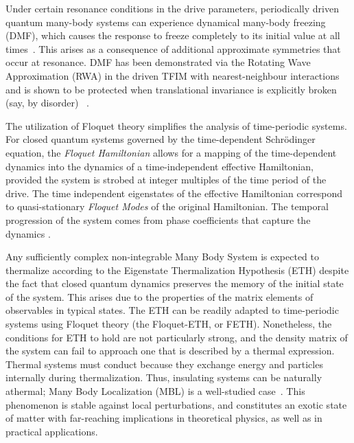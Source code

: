 \documentclass[%
reprint,
superscriptaddress,
linenumbers,
amsmath,amssymb,
aps,
prb,
showkeys,
]{revtex4-2}
\begin{document}
{Under certain resonance conditions in the drive parameters, periodically driven quantum many-body systems can experience dynamical many-body freezing (DMF), which causes the response to freeze completely to its initial value at all times}~\cite{bordia_periodically_2017, sahoo_periodically_2019, das_exotic_2010}. This arises as a consequence of additional approximate symmetries that occur at resonance. DMF has been demonstrated via the Rotating Wave Approximation (RWA) in the driven TFIM with nearest-neighbour interactions ~\cite{mbeng_quantum_2020} and is shown to be protected when translational invariance is explicitly broken (say, by disorder) ~\cite{yamada_localization_2022, roy_fate_2015}. 

The utilization of Floquet theory simplifies the analysis of time-periodic systems. For closed quantum systems governed by the time-dependent Schr\"odinger equation, the \textit{Floquet Hamiltonian} allows for a mapping of the time-dependent dynamics into the dynamics of 	
a time-independent effective Hamiltonian, provided the system is strobed at integer multiples of the time period of the drive. The time independent eigenstates of the effective Hamiltonian correspond to quasi-stationary \textit{Floquet Modes} of the original Hamiltonian. The temporal progression of the system comes from  phase coefficients that capture the dynamics \cite{li_floquet_2018,eckardt_high_frequency_2015}.	
	
	Any sufficiently complex non-integrable Many Body System is expected to thermalize according to the Eigenstate Thermalization Hypothesis (ETH) despite the fact that closed quantum dynamics preserves the memory of the initial state of the system. This arises due to the properties of the matrix elements of observables 
	in typical states\cite{zhang_floquet_2016}. The ETH can be readily adapted to time-periodic systems using Floquet theory (the Floquet-ETH, or FETH). Nonetheless, the conditions for ETH to hold are not particularly strong, and the density matrix of the system can fail to approach one that is described by a thermal expression.  Thermal systems must conduct because they exchange energy and particles internally during thermalization. Thus, insulating systems can be naturally athermal;  Many Body Localization (MBL) is a well-studied case~\cite{khemani_phase_2016}. This phenomenon is stable against local perturbations, and constitutes an exotic state of matter with far-reaching implications in theoretical physics, as well as in practical applications\cite{yunger_halpern_quantum_2019}.
	
\end{document}
